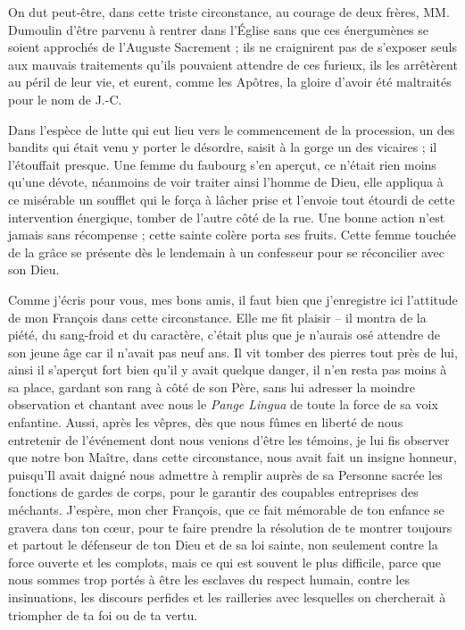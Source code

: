 \documentclass[11pt,a4paper]{report}
\begin{document}
On dut peut-être, dans cette triste circonstance, au courage de deux frères, MM. Dumoulin d'être parvenu à rentrer dans l'Église sans que ces énergumènes se soient approchés de l'Auguste Sacrement ; ils ne craignirent pas de s'exposer seuls aux mauvais traitements qu'ils pouvaient attendre de ces furieux, ils les arrêtèrent au péril de leur vie, et eurent, comme les Apôtres, la gloire d'avoir été maltraités pour le nom de J.-C.

Dans l'espèce de lutte qui eut lieu vers le commencement de la procession, un des bandits qui était venu y porter le désordre, saisit à la gorge un des vicaires ; il l'étouffait presque. Une femme du faubourg s'en aperçut, ce n'était rien moins qu'une dévote, néanmoins de voir traiter ainsi l'homme de Dieu, elle appliqua à ce misérable un soufflet qui le força à lâcher prise et l'envoie tout étourdi de cette intervention énergique, tomber de l'autre côté de la rue. Une bonne action n'est jamais sans récompense ; cette sainte colère porta ses fruits. Cette femme touchée de la grâce se présente dès le lendemain à un confesseur pour se réconcilier avec son Dieu.

Comme j'écris pour vous, mes bons amis, il faut bien que j'enregistre ici l'attitude de mon François dans cette circonstance. Elle me fit plaisir -- il montra de la piété, du sang-froid et du caractère, c'était plus que je n'aurais osé attendre de son jeune âge car il n'avait pas neuf ans. Il vit tomber des pierres tout près de lui, ainsi il s'aperçut fort bien qu'il y avait quelque danger, il n'en resta pas moins à sa place, gardant son rang à côté de son Père, sans lui adresser la moindre observation et chantant avec nous le \textit{Pange Lingua} de toute la force de sa voix enfantine. Aussi, après les vêpres, dès que nous fûmes en liberté de nous entretenir de l'événement dont nous venions d'être les témoins, je lui fis observer que notre bon Maître, dans cette circonstance, nous avait fait un insigne honneur, puisqu'Il avait daigné nous admettre à remplir auprès de sa Personne sacrée les fonctions de gardes de corps, pour le garantir des coupables entreprises des méchants. J'espère, mon cher François, que ce fait mémorable de ton enfance se gravera dans ton cœur, pour te faire prendre la résolution de te montrer toujours et partout le défenseur de ton Dieu et de sa loi sainte, non seulement contre la force ouverte et les complots, mais ce qui est souvent le plus difficile, parce que nous sommes trop portés à être les esclaves du respect humain, contre les insinuations, les discours perfides et les railleries avec lesquelles on chercherait à triompher de ta foi ou de ta vertu.
\end{document}
